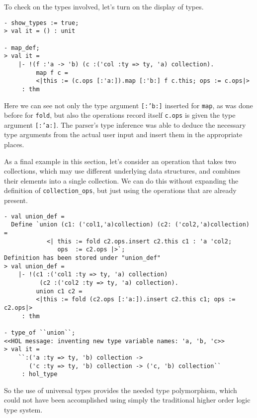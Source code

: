 To check on the types involved, let's turn on the display of types.
\begin{session}
\begin{verbatim}
- show_types := true;
> val it = () : unit

- map_def;
> val it =
    |- !(f :'a -> 'b) (c :('col :ty => ty, 'a) collection).
         map f c =
         <|this := (c.ops [:'a:]).map [:'b:] f c.this; ops := c.ops|>
     : thm
\end{verbatim}
\end{session}
Here we can see not only the type argument \texttt{[:'b:]} inserted for \texttt{map},
as was done before for \texttt{fold}, but also the operations record itself
\texttt{c.ops} is given the type argument \texttt{[:'a:]}.  The parser's type inference
was able to deduce the necessary type arguments from the actual user input and
insert them in the appropriate places.

As a final example in this section, let's consider an operation that takes two collections,
which may use different underlying data structures, and combines their elements into a 
single collection.  We can do this without expanding the definition of
\texttt{collection\_ops}, but just using the operations that are already present.
\begin{session}
\begin{verbatim}
- val union_def =
  Define `union (c1: ('col1,'a)collection) (c2: ('col2,'a)collection) =
            <| this := fold c2.ops.insert c2.this c1 : 'a 'col2;
               ops  := c2.ops |>`;
Definition has been stored under "union_def"
> val union_def =
    |- !(c1 :('col1 :ty => ty, 'a) collection)
          (c2 :('col2 :ty => ty, 'a) collection).
         union c1 c2 =
         <|this := fold (c2.ops [:'a:]).insert c2.this c1; ops := c2.ops|>
     : thm

- type_of ``union``;
<<HOL message: inventing new type variable names: 'a, 'b, 'c>>
> val it =
    ``:('a :ty => ty, 'b) collection ->
       ('c :ty => ty, 'b) collection -> ('c, 'b) collection``
     : hol_type
\end{verbatim}
\end{session}



So the use of universal types
provides the needed
type polymorphism, which could not have been accomplished using simply the traditional
higher order logic type system.



